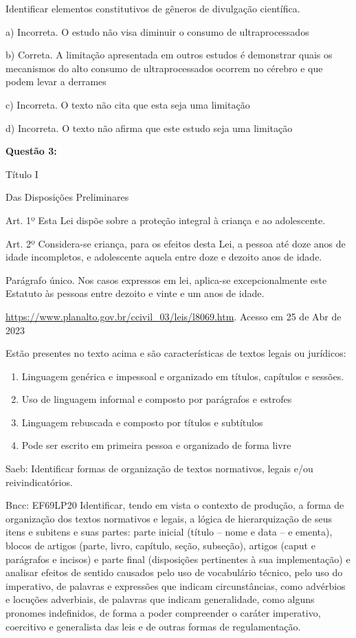 Identificar elementos constitutivos de gêneros de divulgação científica.

a) Incorreta. O estudo não visa diminuir o consumo de ultraprocessados

b) Correta. A limitação apresentada em outros estudos é demonstrar quais
os mecanismos do alto consumo de ultraprocessados ocorrem no cérebro e
que podem levar a derrames

c) Incorreta. O texto não cita que esta seja uma limitação

d) Incorreta. O texto não afirma que este estudo seja uma limitação

\textbf{Questão 3:}

Título I

Das Disposições Preliminares

Art. 1º Esta Lei dispõe sobre a proteção integral à criança e ao
adolescente.

Art. 2º Considera-se criança, para os efeitos desta Lei, a pessoa até
doze anos de idade incompletos, e adolescente aquela entre doze e
dezoito anos de idade.

Parágrafo único. Nos casos expressos em lei, aplica-se excepcionalmente
este Estatuto às pessoas entre dezoito e vinte e um anos de idade.

\href{https://www.planalto.gov.br/ccivil_03/leis/l8069.htm}{{https://www.planalto.gov.br/ccivil\_03/leis/l8069.htm}}.
Acesso em 25 de Abr de 2023

Estão presentes no texto acima e são características de textos legais ou
jurídicos:

\begin{enumerate}
\def\labelenumi{\alph{enumi})}
\item
  Linguagem genérica e impessoal e organizado em títulos, capítulos e
  sessões.
\item
  Uso de linguagem informal e composto por parágrafos e estrofes
\item
  Linguagem rebuscada e composto por títulos e subtítulos
\item
  Pode ser escrito em primeira pessoa e organizado de forma livre
\end{enumerate}

Saeb: Identificar formas de organização de textos normativos, legais
e/ou reivindicatórios.

Bncc: EF69LP20 Identificar, tendo em vista o contexto de produção, a
forma de organização dos textos normativos e legais, a lógica de
hierarquização de seus itens e subitens e suas partes: parte inicial
(título -- nome e data -- e ementa), blocos de artigos (parte, livro,
capítulo, seção, subseção), artigos (caput e parágrafos e incisos) e
parte final (disposições pertinentes à sua implementação) e analisar
efeitos de sentido causados pelo uso de vocabulário técnico, pelo uso do
imperativo, de palavras e expressões que indicam circunstâncias, como
advérbios e locuções adverbiais, de palavras que indicam generalidade,
como alguns pronomes indefinidos, de forma a poder compreender o caráter
imperativo, coercitivo e generalista das leis e de outras formas de
regulamentação.

